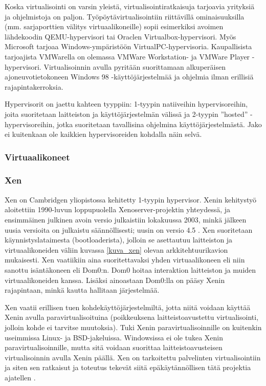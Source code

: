 
Koska virtualisointi on varsin yleistä, virtualisointiratkaisuja tarjoavia yrityksiä ja ohjelmistoja on paljon. Työpöytävirtualisointiin riittävillä ominaisuuksilla (mm. sarjaporttien välitys virtuaalikoneille) sopii esimerkiksi avoimen lähdekoodin QEMU-hypervisori tai Oraclen Virtualbox-hypervisori. Myös Microsoft tarjoaa Windows-ympäristöön VirtualPC-hypervisoria. Kaupallisista tarjoajista VMWarella on olemassa VMWare Workstation- ja VMWare Player -hypervisori. Virtualisoinnin avulla pyritään suorittamaan alkuperäisen ajoneuvotietokoneen Windows 98 -käyttöjärjestelmää ja ohjelmia ilman erillisiä rajapintakerroksia.

Hypervisorit on jaettu kahteen tyyppiin: 1-tyypin natiiveihin hypervisoreihin, joita suoritetaan laitteiston ja käyttöjärjestelmän välissä ja 2-tyypin ''hosted'' -hypervisoreihin, jotka suoritetaan tavallisina ohjelmina käyttöjärjestelmästä. Jako ei kuitenkaan ole kaikkien hypervisoreiden kohdalla näin selvä. %


\subsubsection{Virtuaalikoneet}
\subsubsection{Xen}
Xen on Cambridgen yliopistossa kehitetty 1-tyypin hypervisor. %
Xenin kehitystyö aloitettiin 1990-luvun loppupuolella Xenoserver-projektin yhteydessä, ja ensimmäinen julkinen avoin versio julkaistiin lokakuussa 2003, minkä jälkeen uusia versioita on julkaistu säännöllisesti; uusin on versio 4.5 \cite{xen_history}. Xen suoritetaan käynnistyslataimesta (bootloaderista), jolloin se asettautuu laitteiston ja virtuaalikoneiden väliin kuvassa \ref{kuva_xen} olevan arkkitehtuurikavion mukaisesti. Xen vaatiikiin aina suoritettavaksi yhden virtuaalikoneen eli niin sanottu isäntäkoneen eli Dom0:n. Dom0 hoitaa interaktion laitteiston ja muiden virtuaalikoneiden kanssa. Lisäksi ainoastaan Dom0:lla on pääsy Xenin rajapintaan, minkä kautta hallitaan järjestelmää.

Xen vaatii erillisen tuen kohdekäyttöjärjestelmiltä, jotta niitä voidaan käyttää Xenin avulla paravirtualisoituina (poikkeuksena laitteistoavustettu virtualisointi, jolloin kohde ei tarvitse muutoksia). Tuki Xenin paravirtualisoinnille on kuitenkin useimmissa Linux- ja BSD-jakeluissa. Windowsissa ei ole tukea Xenin paravirtualisoinnille, mutta sitä voidaan suorittaa laitteistoavusteisen virtualisoinnin avulla Xenin päällä. Xen on tarkoitettu palvelinten virtualisointiin ja siten sen ratkaisut ja toteutus tekevät siitä epäkäytännöllisen tätä projektia ajatellen \cite{xen_overview}.

